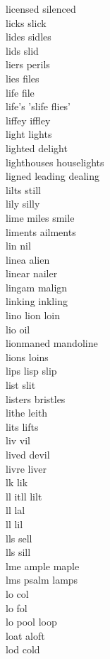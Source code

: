 licensed silenced\\
licks slick\\
lides sidles \\
lids slid\\
liers perils \\
lies files \\
life file\\
life's 'slife flies'\\
liffey iffley\\
light lights \\
lighted delight\\
lighthouses houselights\\
ligned leading dealing \\
lilts still\\
lily silly \\
lime miles smile \\
liments ailments \\
lin nil\\
linea alien\\
linear nailer\\
lingam malign\\
linking inkling\\
lino lion loin\\
lio oil\\
lionmaned mandoline\\
lions loins\\
lips lisp slip\\
list slit\\
listers bristles \\
lithe leith\\
lits lifts \\
liv vil\\
lived devil\\
livre liver\\
lk lik \\
ll itll lilt  \\
ll lal \\
ll lil \\
lls sell \\
lls sill \\
lme ample maple  \\
lms psalm lamps  \\
lo col \\
lo fol \\
lo pool loop  \\
loat aloft \\
lod cold \\
